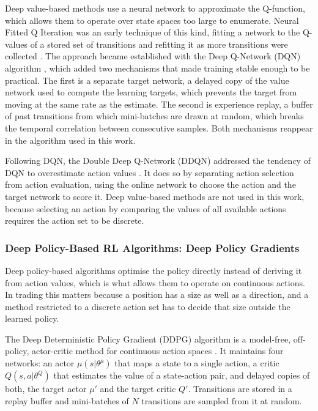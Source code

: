 Deep value-based methods use a neural network to approximate the Q-function, which allows them to operate over state spaces too large to enumerate. Neural Fitted Q Iteration was an early technique of this kind, fitting a network to the Q-values of a stored set of transitions and refitting it as more transitions were collected \cite{riedmiller_neural_2005}. The approach became established with the Deep Q-Network (DQN) algorithm \cite{mnih_human-level_2015}, which added two mechanisms that made training stable enough to be practical. The first is a separate target network, a delayed copy of the value network used to compute the learning targets, which prevents the target from moving at the same rate as the estimate. The second is experience replay, a buffer of past transitions from which mini-batches are drawn at random, which breaks the temporal correlation between consecutive samples. Both mechanisms reappear in the algorithm used in this work.

Following DQN, the Double Deep Q-Network (DDQN) addressed the tendency of DQN to overestimate action values \cite{van_hasselt_deep_2016}. It does so by separating action selection from action evaluation, using the online network to choose the action and the target network to score it. Deep value-based methods are not used in this work, because selecting an action by comparing the values of all available actions requires the action set to be discrete.

\subsubsection{Deep Policy-Based RL Algorithms: Deep Policy Gradients}

Deep policy-based algorithms optimise the policy directly instead of deriving it from action values, which is what allows them to operate on continuous actions. In trading this matters because a position has a size as well as a direction, and a method restricted to a discrete action set has to decide that size outside the learned policy.

The Deep Deterministic Policy Gradient (DDPG) algorithm is a model-free, off-policy, actor-critic method for continuous action spaces \cite{lillicrap_continuous_2015}. It maintains four networks: an actor \( \mu(s | \theta^{\mu}) \) that maps a state to a single action, a critic \( Q(s, a | \theta^{Q}) \) that estimates the value of a state-action pair, and delayed copies of both, the target actor \( \mu' \) and the target critic \( Q' \). Transitions are stored in a replay buffer and mini-batches of \( N \) transitions are sampled from it at random.

